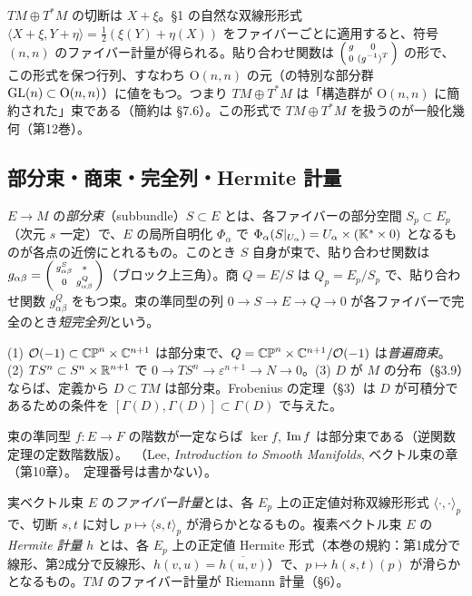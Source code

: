\begin{ex}[$TM\oplus T^*M$]\label{C:ex:TTstar}
$TM\oplus T^*M$ の切断は $X+\xi$。§1 の自然な双線形形式 $\langle X+\xi,Y+\eta\rangle=\frac12(\xi(Y)+\eta(X))$ をファイバーごとに適用すると、符号 $(n,n)$ のファイバー計量が得られる。貼り合わせ関数は $\begin{psmallmatrix}g&0\\0&(g^{-1})^T\end{psmallmatrix}$ の形で、この形式を保つ行列、すなわち $\mathrm O(n,n)$ の元（の特別な部分群 $\mathrm{GL}(n)\subset\mathrm O(n,n)$）に値をもつ。つまり $TM\oplus T^*M$ は「構造群が $\mathrm O(n,n)$ に簡約された」束である（簡約は §7.6）。この形式で $TM\oplus T^*M$ を扱うのが一般化幾何（第12巻）。
\end{ex}

\subsection{部分束・商束・完全列・Hermite 計量}
\begin{defn}[部分束・商束]\label{C:def:sub}
$E\to M$ の\emph{部分束}（subbundle）$S\subset E$ とは、各ファイバーの部分空間 $S_p\subset E_p$（次元 $s$ 一定）で、$E$ の局所自明化 $\Phi_\alpha$ で $\Phi_\alpha(S|_{U_\alpha})=U_\alpha\times(\mathbb K^s\times0)$ となるものが各点の近傍にとれるもの。このとき $S$ 自身が束で、貼り合わせ関数は $g_{\alpha\beta}=\begin{psmallmatrix}g^S_{\alpha\beta}&*\\0&g^Q_{\alpha\beta}\end{psmallmatrix}$（ブロック上三角）。商 $Q=E/S$ は $Q_p=E_p/S_p$ で、貼り合わせ関数 $g^Q_{\alpha\beta}$ をもつ束。束の準同型の列 $0\to S\to E\to Q\to0$ が各ファイバーで完全のとき\emph{短完全列}という。
\end{defn}
\begin{ex}
(1) $\mathcal O(-1)\subset\mathbb{CP}^n\times\mathbb C^{n+1}$ は部分束で、$Q=\mathbb{CP}^n\times\mathbb C^{n+1}/\mathcal O(-1)$ は\emph{普遍商束}。(2) $TS^n\subset S^n\times\mathbb R^{n+1}$ で $0\to TS^n\to\varepsilon^{n+1}\to N\to0$。(3) $D$ が $M$ の分布（§3.9）ならば、定義から $D\subset TM$ は部分束。Frobenius の定理（§3）は $D$ が可積分であるための条件を $[\Gamma(D),\Gamma(D)]\subset\Gamma(D)$ で与えた。
\end{ex}
束の準同型 $f:E\to F$ の階数が一定ならば $\ker f$, $\operatorname{Im} f$ は部分束である（逆関数定理の定数階数版）。\tC\ （Lee, \emph{Introduction to Smooth Manifolds}, ベクトル束の章（第10章）。\tQ\ 定理番号は書かない）。

\begin{defn}\label{C:def:herm}
実ベクトル束 $E$ の\emph{ファイバー計量}とは、各 $E_p$ 上の正定値対称双線形形式 $\langle\cdot,\cdot\rangle_p$ で、切断 $s,t$ に対し $p\mapsto\langle s,t\rangle_p$ が滑らかとなるもの。複素ベクトル束 $E$ の \emph{Hermite 計量} $h$ とは、各 $E_p$ 上の正定値 Hermite 形式（本巻の規約：第1成分で線形、第2成分で反線形、$h(v,u)=\overline{h(u,v)}$）で、$p\mapsto h(s,t)(p)$ が滑らかとなるもの。$TM$ のファイバー計量が Riemann 計量（§6）。
\end{defn}

